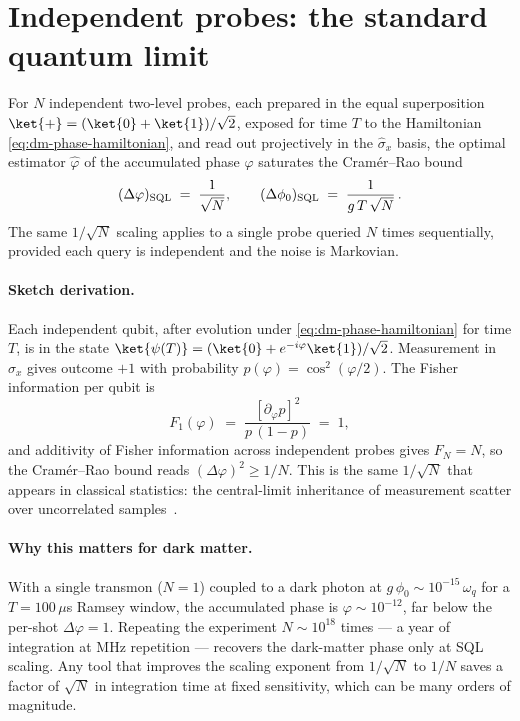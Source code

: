 \section{Independent probes: the standard quantum limit}
\label{sec:sql}

\begin{statement}
\label{stmt:sql}
For $N$ independent two-level probes, each prepared in the
equal superposition $\ket{+}=(\ket{0}+\ket{1})/\sqrt 2$,
exposed for time $T$ to the Hamiltonian
\cref{eq:dm-phase-hamiltonian}, and read out projectively in
the $\hat\sigma_x$ basis, the optimal estimator $\hat\varphi$
of the accumulated phase $\varphi$ saturates the
Cram\'{e}r--Rao bound
\begin{equation}
\label{eq:sql-bound}
(\Delta\varphi)_{\rm SQL} \;=\; \frac{1}{\sqrt{N}},
\qquad
(\Delta\phi_0)_{\rm SQL} \;=\; \frac{1}{g\,T\,\sqrt{N}}\,.
\end{equation}
The same $1/\sqrt{N}$ scaling applies to a single probe queried
$N$ times sequentially, provided each query is independent and
the noise is Markovian.
\end{statement}

\paragraph{Sketch derivation.}
Each independent qubit, after evolution under
\cref{eq:dm-phase-hamiltonian} for time $T$, is in the state
$\ket{\psi(T)}=(\ket{0}+e^{-i\varphi}\ket{1})/\sqrt 2$.
Measurement in $\hat\sigma_x$ gives outcome $+1$ with
probability $p(\varphi)=\cos^2(\varphi/2)$. The Fisher information
per qubit is~\cite{degen2017}
\begin{equation}
F_1(\varphi) \;=\; \frac{[\partial_\varphi p]^2}{p\,(1-p)} \;=\; 1,
\end{equation}
and additivity of Fisher information across independent probes
gives $F_N=N$, so the Cram\'{e}r--Rao bound reads
$(\Delta\varphi)^2 \geq 1/N$. This is the same $1/\sqrt N$
that appears in classical statistics: the central-limit
inheritance of measurement scatter over uncorrelated
samples~\cite{caves1981,wineland1992}.

\paragraph{Why this matters for dark matter.}
With a single transmon ($N=1$) coupled to a dark photon at
$g\,\phi_0\sim 10^{-15}\,\omega_q$ for a $T=100\,\mu$s
Ramsey window, the accumulated phase is $\varphi\sim 10^{-12}$,
far below the per-shot $\Delta\varphi=1$. Repeating the
experiment $N\sim 10^{18}$ times --- a year of integration
at MHz repetition --- recovers the dark-matter phase only at
SQL scaling. Any tool that improves the scaling exponent from
$1/\sqrt N$ to $1/N$ saves a factor of $\sqrt{N}$ in
integration time at fixed sensitivity, which can be
many orders of magnitude.

